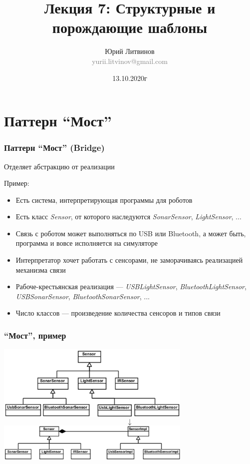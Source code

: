 \documentclass[xetex,mathserif,serif]{beamer}
\title[Шаблоны]{Лекция 7: Структурные и порождающие шаблоны}
\author[Юрий Литвинов]{Юрий Литвинов\\\small{\textcolor{gray}{yurii.litvinov@gmail.com}}}
\date{13.10.2020г}
\begin{document}
	\frame{\titlepage}

	\section{Паттерн ``Мост''}

	\begin{frame}
		\frametitle{Паттерн ``Мост'' (Bridge)}
		Отделяет абстракцию от реализации

		Пример:
		\begin{itemize}
			\item Есть система, интерпретирующая программы для роботов
			\item Есть класс \textit{Sensor}, от которого наследуются \textit{SonarSensor}, \textit{LightSensor}, ...
			\item Связь с роботом может выполняться по USB или Bluetooth, а может быть, программа и вовсе исполняется на симуляторе
			\item Интерпретатор хочет работать с сенсорами, не заморачиваясь реализацией механизма связи
			\item Рабоче-крестьянская реализация --- \textit{USBLightSensor}, \textit{BluetoothLightSensor}, \textit{USBSonarSensor}, \textit{BluetoothSonarSensor}, ...
			\item Число классов --- произведение количества сенсоров и типов связи
		\end{itemize}
	\end{frame}

	\begin{frame}
		\frametitle{``Мост'', пример}
		\begin{center}
			\includegraphics[width=0.7\textwidth]{noBridge.png}
			\Huge{$$\downarrow$$}
			\includegraphics[width=0.7\textwidth]{bridge.png}
		\end{center}
	\end{frame}
\end{document}
